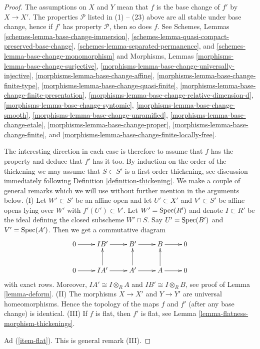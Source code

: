 \begin{proof}
The assumptions on $X$ and $Y$ mean that $f$ is the base change of
$f'$ by $X \to X'$.
The properties $\mathcal{P}$ listed in (1) -- (23) above are all stable
under base change, hence if $f'$ has property $\mathcal{P}$, then so
does $f$. See
Schemes, Lemmas \ref{schemes-lemma-base-change-immersion},
\ref{schemes-lemma-quasi-compact-preserved-base-change},
\ref{schemes-lemma-separated-permanence}, and
\ref{schemes-lemma-base-change-monomorphism}
and
Morphisms, Lemmas
\ref{morphisms-lemma-base-change-surjective},
\ref{morphisms-lemma-base-change-universally-injective},
\ref{morphisms-lemma-base-change-affine},
\ref{morphisms-lemma-base-change-finite-type},
\ref{morphisms-lemma-base-change-quasi-finite},
\ref{morphisms-lemma-base-change-finite-presentation},
\ref{morphisms-lemma-base-change-relative-dimension-d},
\ref{morphisms-lemma-base-change-syntomic},
\ref{morphisms-lemma-base-change-smooth},
\ref{morphisms-lemma-base-change-unramified},
\ref{morphisms-lemma-base-change-etale},
\ref{morphisms-lemma-base-change-proper},
\ref{morphisms-lemma-base-change-finite}, and
\ref{morphisms-lemma-base-change-finite-locally-free}.

\medskip\noindent
The interesting direction in each case is therefore to assume
that $f$ has the property and deduce that $f'$ has it too.
By induction on the order of the thickening we may
assume that $S \subset S'$ is a first order thickening, see
discussion immediately following
Definition \ref{definition-thickening}.
We make a couple of general remarks which we will use without further
mention in the arguments below.
(I) Let $W' \subset S'$ be an affine open and let $U' \subset X'$
and $V' \subset S'$ be affine opens lying over $W'$ with $f'(U') \subset V'$.
Let $W' = \mathop{\rm Spec}(R')$ and denote $I \subset R'$ be the ideal
defining the closed subscheme $W' \cap S$. Say $U' = \mathop{\rm Spec}(B')$
and $V' = \mathop{\rm Spec}(A')$. Then we get a commutative diagram
$$
\xymatrix{
0 \ar[r] &
IB' \ar[r] &
B' \ar[r] &
B \ar[r] & 0 \\
0 \ar[r] &
IA' \ar[r] \ar[u] &
A' \ar[r] \ar[u] &
A \ar[r] \ar[u] & 0
}
$$
with exact rows. Moreover, $IA' \cong I \otimes_R A$ and
$IB' \cong I \otimes_R B$, see proof of
Lemma \ref{lemma-deform}.
(II) The morphisms $X \to X'$ and $Y \to Y'$ are universal homeomorphisms.
Hence the topology of the maps $f$ and $f'$ (after any base change)
is identical. (III) If $f$ is flat, then $f'$ is flat, see
Lemma \ref{lemma-flatness-morphism-thickenings}.

\medskip\noindent
Ad (\ref{item-flat}). This is general remark (III).


\end{proof}
